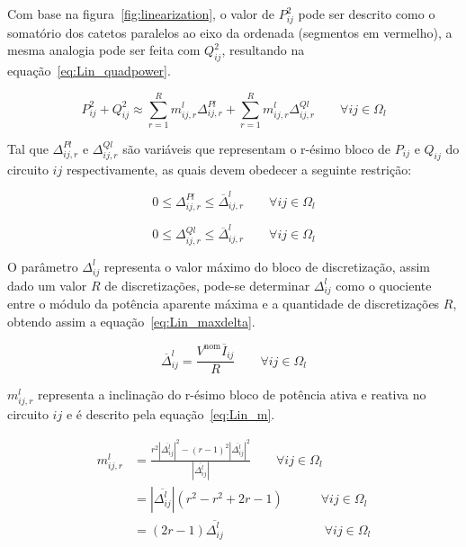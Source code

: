 Com base na figura~\ref{fig:linearization}, o valor de $P_{ij}^{2}$ pode ser descrito como o somatório dos catetos paralelos ao eixo da ordenada (segmentos em vermelho), a mesma analogia pode ser feita com $Q_{ij}^{2}$, resultando na equação~\eqref{eq:Lin_quadpower}.

\begin{equation}\label{eq:Lin_quadpower}
    P_{ij}^2 + Q_{ij}^2 \approx \sum_{r = 1}^{R}m_{ij,r}^{l}\Delta_{ij,r}^{Pl} + \sum_{r = 1}^{R}m_{ij,r}^{l}\Delta_{ij,r}^{Ql} \qquad\forall ij\in\Omega_{l} 
\end{equation}

Tal que $\Delta_{ij,r}^{Pl}$ e $\Delta_{ij,r}^{Ql}$ são variáveis que representam o r-ésimo bloco de $P_{ij}$ e $Q_{ij}$ do circuito $ij$ respectivamente, as quais devem obedecer a seguinte restrição:

\begin{equation}\label{eq:Lin_Pdeltalim}
    0 \leq \Delta_{ij,r}^{Pl} \leq \overline{\Delta}_{ij,r}^l \qquad\forall ij\in\Omega_{l} 
\end{equation}

\begin{equation}\label{eq:Lin_Qdeltalim}
    0 \leq \Delta_{ij,r}^{Ql} \leq \overline{\Delta}_{ij,r}^l \qquad\forall ij\in\Omega_{l} 
\end{equation}

O parâmetro $\Delta_{ij}^{l}$ representa o valor máximo do bloco de discretização, assim dado um valor $R$ de discretizações, pode-se determinar $\Delta_{ij}^{l}$ como o quociente entre o módulo da potência aparente máxima e a quantidade de discretizações $R$, obtendo assim a equação~\eqref{eq:Lin_maxdelta}.

\begin{equation}\label{eq:Lin_maxdelta}
    \overline{\Delta}_{ij}^{l} = \frac{V^{\text{nom}}\overline{I}_{ij}}{R} \qquad\forall ij\in\Omega_{l} 
\end{equation}

$m_{ij,r}^{l}$ representa a inclinação do r-ésimo bloco de potência ativa e reativa no circuito $ij$ e é descrito pela equação~\eqref{eq:Lin_m}.

\begin{equation}\label{eq:Lin_m}
    \begin{split}
        m_{ij,r}^{l} & = \frac{r^2|\overline{\Delta_{ij}^{l}}|^2 - (r-1)^2|\overline{\Delta_{ij}^{l}}|^2}{|\overline{\Delta_{ij}^{l}}|}\qquad\forall ij\in\Omega_{l}\\
        & = |\overline{\Delta_{ij}^{l}}|(r^2 - r^2 + 2r - 1)\qquad\quad\forall ij\in\Omega_{l}\\
        & = (2r-1)\overline{\Delta_{ij}^{l}}\qquad\qquad\qquad\qquad\forall ij\in\Omega_{l}
    \end{split}
\end{equation}

